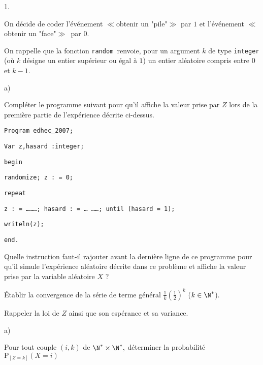 \documentclass[11pt]{article}%
\begin{document}
\begin{noliste}{1.}
 \setlength{\itemsep}{4mm}
\item On décide de coder l'événement $\ll $obtenir un "pile"$\gg 
$ par $1$ et l'événement $\ll $obtenir un "face"$\gg $\ par $0.$

On rappelle que la fonction \texttt{random }renvoie, pour un argument
$k$ de
type \texttt{integer} (où $k$ désigne un entier supérieur ou 
égal à $1$) un entier aléatoire compris entre $0$ et $k-1.$

\begin{noliste}{a)}
 \setlength{\itemsep}{2mm}
\item Compléter le programme suivant pour qu'il affiche la valeur prise
par $Z$ lors de la première partie de l'expérience décrite
ci-dessus.

\texttt{Program edhec\_{2}007;}

\texttt{Var z,hasard :integer;}

\texttt{begin}

\texttt{\hspace{1cm}randomize; z : = 0;}

\texttt{\hspace{1cm}repeat }

\texttt{\hspace{2cm}z : = \ldots \ldots \ldots ; hasard : = \ldots
\ldots \ldots ;
until (hasard = 1);}

\texttt{\hspace{1cm}writeln(z);}

\texttt{end.}

\item Quelle instruction faut-il rajouter avant la dernière ligne de ce
programme pour qu'il simule l'expérience aléatoire décrite dans
ce problème et affiche la valeur prise par la variable aléatoire $X$
 ?
\end{noliste}

\item Établir la convergence de la série de terme général
$\frac{1}{k}\left( \frac{1}{2}\right) ^{k}$ ($k\in \N^{\ast }$).

\item Rappeler la loi de $Z$ ainsi que son espérance et sa variance.

\item 
\begin{noliste}{a)}
 \setlength{\itemsep}{2mm}
\item Pour tout couple $\left( i,k\right) $ de $\N^{\ast }\times 
\N^{\ast },$ déterminer la probabilité $\mathrm{P}_{\left[
Z = k\right] }\left( X = i\right) $


\end{noliste}
\end{noliste}
\end{document}
